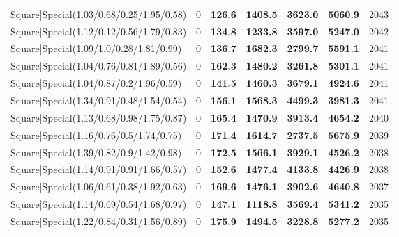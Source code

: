 \begin{tabular}{lrllllr}
 Square|Special(1.03/0.68/0.25/1.95/0.58)                      &             0   & \textbf{126.6} & \textbf{1408.5} & \textbf{3623.0} & \textbf{5060.9} &         2043 \\
 Square|Special(1.12/0.12/0.56/1.79/0.83)                      &             0   & \textbf{134.8} & \textbf{1233.8} & \textbf{3597.0} & \textbf{5247.0} &         2042 \\
 Square|Special(1.09/1.0/0.28/1.81/0.99)                       &             0   & \textbf{136.7} & \textbf{1682.3} & \textbf{2799.7} & \textbf{5591.1} &         2041 \\
 Square|Special(1.04/0.76/0.81/1.89/0.56)                      &             0   & \textbf{162.3} & \textbf{1480.2} & \textbf{3261.8} & \textbf{5301.1} &         2041 \\
 Square|Special(1.04/0.87/0.2/1.96/0.59)                       &             0   & \textbf{141.5} & \textbf{1460.3} & \textbf{3679.1} & \textbf{4924.6} &         2041 \\
 Square|Special(1.34/0.91/0.48/1.54/0.54)                      &             0   & \textbf{156.1} & \textbf{1568.3} & \textbf{4499.3} & \textbf{3981.3} &         2041 \\
 Square|Special(1.13/0.68/0.98/1.75/0.87)                      &             0   & \textbf{165.4} & \textbf{1470.9} & \textbf{3913.4} & \textbf{4654.2} &         2040 \\
 Square|Special(1.16/0.76/0.5/1.74/0.75)                       &             0   & \textbf{171.4} & \textbf{1614.7} & \textbf{2737.5} & \textbf{5675.9} &         2039 \\
 Square|Special(1.39/0.82/0.9/1.42/0.98)                       &             0   & \textbf{172.5} & \textbf{1566.1} & \textbf{3929.1} & \textbf{4526.2} &         2038 \\
 Square|Special(1.14/0.91/0.91/1.66/0.57)                      &             0   & \textbf{152.6} & \textbf{1477.4} & \textbf{4133.8} & \textbf{4426.9} &         2038 \\
 Square|Special(1.06/0.61/0.38/1.92/0.63)                      &             0   & \textbf{169.6} & \textbf{1476.1} & \textbf{3902.6} & \textbf{4640.8} &         2037 \\
 Square|Special(1.14/0.69/0.54/1.68/0.97)                      &             0   & \textbf{147.1} & \textbf{1118.8} & \textbf{3569.4} & \textbf{5341.2} &         2035 \\
 Square|Special(1.22/0.84/0.31/1.56/0.89)                      &             0   & \textbf{175.9} & \textbf{1494.5} & \textbf{3228.8} & \textbf{5277.2} &         2035 \\

\end{tabular}
